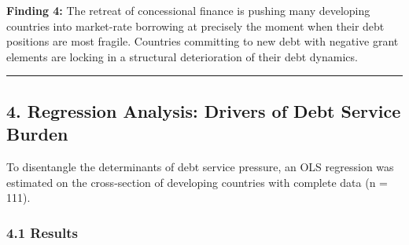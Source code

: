 \documentclass[
  letterpaper,
  DIV=11,
  numbers=noendperiod]{scrartcl}
\begin{document}
\textbf{Finding 4:} The retreat of concessional finance is pushing many
developing countries into market-rate borrowing at precisely the moment
when their debt positions are most fragile. Countries committing to new
debt with negative grant elements are locking in a structural
deterioration of their debt dynamics.

\begin{center}\rule{0.5\linewidth}{0.5pt}\end{center}

\subsection{4. Regression Analysis: Drivers of Debt Service
Burden}\label{regression-analysis-drivers-of-debt-service-burden}

To disentangle the determinants of debt service pressure, an OLS
regression was estimated on the cross-section of developing countries
with complete data (n = 111).

\subsubsection{4.1 Results}\label{results-1}
\end{document}
